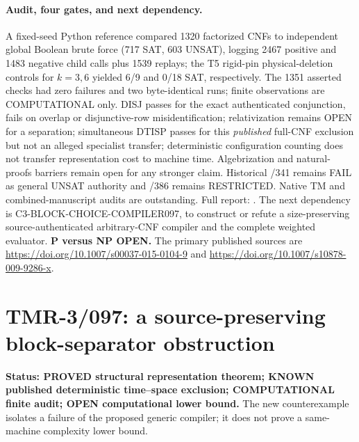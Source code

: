 \documentclass[11pt]{article}
\begin{document}
\paragraph{Audit, four gates, and next dependency.}
A fixed-seed Python reference compared 1320 factorized CNFs to independent
global Boolean brute force (717 SAT, 603 UNSAT), logging 2467 positive
and 1483 negative child calls plus 1539 replays; the T5 rigid-pin
physical-deletion controls for $k=3,6$ yielded 6/9 and 0/18 SAT,
respectively. The 1351 asserted checks had zero failures and two
byte-identical runs; finite observations are COMPUTATIONAL only.
DISJ passes for the exact authenticated conjunction, fails on overlap
or disjunctive-row misidentification; relativization remains OPEN for
a separation; simultaneous DTISP passes for this \emph{published}
full-CNF exclusion but not an alleged specialist transfer; deterministic
configuration counting does not transfer representation cost to machine
time. Algebrization and natural-proofs barriers remain open for any
stronger claim. Historical /341 remains FAIL as general UNSAT authority
and /386 remains RESTRICTED. Native TM and combined-manuscript audits
are outstanding. Full report:
.
The next dependency is \textsf{C3-BLOCK-CHOICE-COMPILER097}, to
construct or refute a size-preserving source-authenticated arbitrary-CNF
compiler and the complete weighted evaluator. \textbf{P versus NP OPEN.}
The primary published sources are
\url{https://doi.org/10.1007/s00037-015-0104-9} and
\url{https://doi.org/10.1007/s10878-009-9286-x}.



\section{TMR-3/097: a source-preserving block-separator obstruction}

\noindent\textbf{Status: PROVED structural representation theorem; KNOWN
published deterministic time--space exclusion; COMPUTATIONAL finite
audit; OPEN computational lower bound.} The new counterexample isolates
a failure of the proposed generic compiler; it does not prove a
same-machine complexity lower bound.
\end{document}
